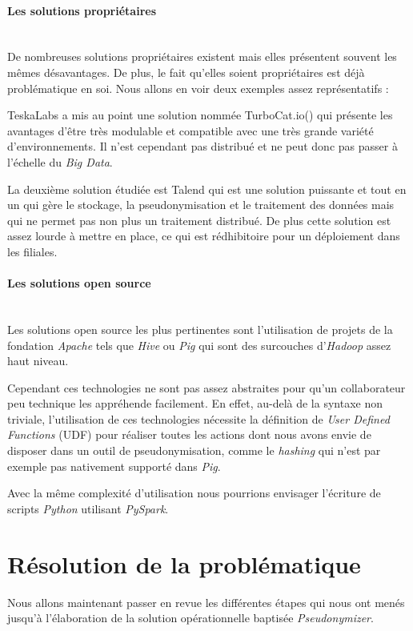 \documentclass[12pt]{report}
\newcommand{\namedparagraph}[1]{\paragraph*{#1}\mbox{}\\}
\begin{document}
	\namedparagraph{Les solutions propriétaires}
	De nombreuses solutions propriétaires existent mais elles présentent souvent les mêmes désavantages. De plus, le fait qu'elles soient propriétaires est déjà problématique en soi. Nous allons en voir deux exemples assez représentatifs : 
	
	TeskaLabs a mis au point une solution nommée TurboCat.io() \cite{turbocat} qui  présente les avantages d'être très modulable et compatible avec une très grande variété d'environnements. Il n'est cependant pas distribué et ne peut donc pas passer à l'échelle du \textit{Big Data}. 
	
	La deuxième solution étudiée est Talend \cite{talend} qui est une solution puissante et tout en un qui gère le stockage, la pseudonymisation  et le traitement des données mais qui ne permet pas non plus un traitement distribué. De plus cette solution est assez lourde à mettre en place, ce qui est rédhibitoire pour un déploiement dans les filiales.
	
	
	\namedparagraph{Les solutions open source}
	Les solutions open source les plus pertinentes sont l'utilisation de projets de la fondation \textit{Apache} tels que \textit{Hive} ou \textit{Pig} qui sont des surcouches d'\textit{Hadoop} assez haut niveau. 
	
	Cependant ces technologies ne sont pas assez abstraites pour qu'un collaborateur peu technique les appréhende facilement. En effet, au-delà de la syntaxe non triviale, l'utilisation de ces technologies nécessite la définition de\textit{ User Defined Functions} (UDF) pour réaliser toutes les actions dont nous avons envie de disposer dans un outil de pseudonymisation, comme le \textit{hashing} qui n'est par exemple pas nativement supporté dans \textit{Pig}.
	
	Avec la même complexité d'utilisation nous pourrions envisager l'écriture de scripts \textit{Python} utilisant \textit{PySpark}.
	
	
	
	\section{Résolution de la problématique}
	
	Nous allons maintenant passer en revue les différentes étapes qui nous ont menés jusqu'à l'élaboration de la solution opérationnelle baptisée \textit{Pseudonymizer}.
\end{document}
